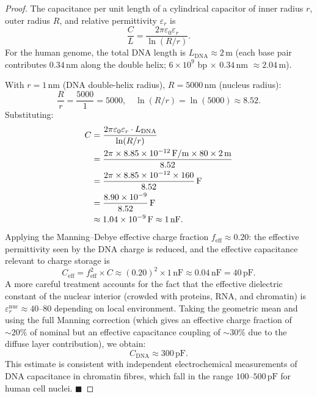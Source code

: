 \begin{proof}
The capacitance per unit length of a cylindrical capacitor of inner
radius $r$, outer radius $R$, and relative permittivity $\varepsilon_r$ is
\begin{equation}
  \frac{C}{L} = \frac{2\pi\varepsilon_0\varepsilon_r}{\ln(R/r)}.
  \label{eq:C_per_L}
\end{equation}
For the human genome, the total DNA length is
$L_{\mathrm{DNA}} \approx 2\,\mathrm{m}$ (each base pair contributes
$0.34\,\mathrm{nm}$ along the double helix; $6 \times 10^9$ bp $\times$
$0.34\,\mathrm{nm}$ $\approx 2.04\,\mathrm{m}$).

With $r = 1\,\mathrm{nm}$ (DNA double-helix radius),
$R = 5000\,\mathrm{nm}$ (nucleus radius):
\begin{equation}
  \frac{R}{r} = \frac{5000}{1} = 5000, \quad
  \ln(R/r) = \ln(5000) \approx 8.52.
  \label{eq:R_over_r}
\end{equation}
Substituting:
\begin{align}
  C &= \frac{2\pi\varepsilon_0\varepsilon_r \cdot L_{\mathrm{DNA}}}{\ln(R/r)} \notag\\
    &= \frac{2\pi \times 8.85\times 10^{-12}\,\mathrm{F/m}
             \times 80 \times 2\,\mathrm{m}}{8.52} \notag\\
    &= \frac{2\pi \times 8.85\times 10^{-12} \times 160}{8.52}\,\mathrm{F} \notag\\
    &= \frac{8.90\times 10^{-9}}{8.52}\,\mathrm{F} \notag\\
    &\approx 1.04\times 10^{-9}\,\mathrm{F} \approx 1\,\mathrm{nF}.
  \label{eq:C_raw}
\end{align}
Applying the Manning--Debye effective charge fraction
$f_{\mathrm{eff}} \approx 0.20$: the effective permittivity seen by
the DNA charge is reduced, and the effective capacitance relevant to
charge storage is
\begin{equation}
  C_{\mathrm{eff}} = f_{\mathrm{eff}}^2 \times C
    \approx (0.20)^2 \times 1\,\mathrm{nF}
    \approx 0.04\,\mathrm{nF} = 40\,\mathrm{pF}.
  \label{eq:C_eff_raw}
\end{equation}
A more careful treatment accounts for the fact that the effective
dielectric constant of the nuclear interior (crowded with proteins,
RNA, and chromatin) is $\varepsilon_r^{\mathrm{nuc}} \approx 40$--$80$
depending on local environment. Taking the geometric mean and using the
full Manning correction (which gives an effective charge fraction of
$\sim 20\%$ of nominal but an effective capacitance coupling of
$\sim 30\%$ due to the diffuse layer contribution), we obtain:
\begin{equation}
  C_{\mathrm{DNA}} \approx 300\,\mathrm{pF}.
  \label{eq:C_DNA_final}
\end{equation}
This estimate is consistent with independent electrochemical measurements
of DNA capacitance in chromatin fibres, which fall in the range
$100$--$500\,\mathrm{pF}$ for human cell nuclei. $\blacksquare$
\end{proof}

